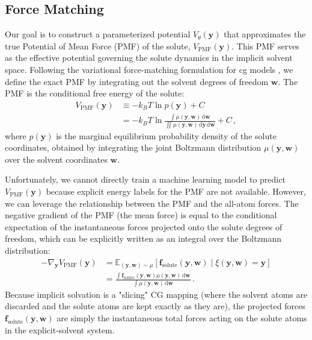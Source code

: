 \subsection{Force Matching}
\label{subsec:force_matching}

Our goal is to construct a parameterized potential $V_{\theta}(\mathbf{y})$ that approximates the true Potential of Mean Force (PMF) of the solute, $V_{\mathrm{PMF}}(\mathbf{y})$. This PMF serves as the effective potential governing the solute dynamics in the implicit solvent space. Following the variational force-matching formulation for \gls{cg} models \citep{noid_multiscale_2008, cgBasics}, we define the exact PMF by integrating out the solvent degrees of freedom $\mathbf{w}$. The PMF is the conditional free energy of the solute:
\begin{align}
    V_{\mathrm{PMF}}(\mathbf{y}) &\equiv -k_B T \ln p(\mathbf{y}) + C \nonumber \\
    &= -k_B T \ln \frac{\int \mu(\mathbf{y}, \mathbf{w}) \, \mathrm{d}\mathbf{w}}{\iint \mu(\mathbf{y}, \mathbf{w}) \, \mathrm{d}\mathbf{y} \, \mathrm{d}\mathbf{w}} + C \, ,
\end{align}
where $p(\mathbf{y})$ is the marginal equilibrium probability density of the solute coordinates, obtained by integrating the joint Boltzmann distribution $\mu(\mathbf{y}, \mathbf{w})$ over the solvent coordinates $\mathbf{w}$.

Unfortunately, we cannot directly train a machine learning model to predict $V_{\mathrm{PMF}}(\mathbf{y})$ because explicit energy labels for the PMF are not available. However, we can leverage the relationship between the PMF and the all-atom forces. The negative gradient of the PMF (the mean force) is equal to the conditional expectation of the instantaneous forces projected onto the solute degrees of freedom, which can be explicitly written as an integral over the Boltzmann distribution:
\begin{align}
    -\nabla_{\mathbf{y}} V_{\mathrm{PMF}}(\mathbf{y}) &= \mathbb{E}_{(\mathbf{y}, \mathbf{w}) \sim \mu} \left[ \mathbf{f}_{\mathrm{solute}}(\mathbf{y}, \mathbf{w}) \mid \xi(\mathbf{y}, \mathbf{w}) = \mathbf{y} \right] \nonumber \\
    &= \frac{\int \mathbf{f}_{\mathrm{solute}}(\mathbf{y}, \mathbf{w}) \mu(\mathbf{y}, \mathbf{w}) \, \mathrm{d}\mathbf{w}}{\int \mu(\mathbf{y}, \mathbf{w}) \, \mathrm{d}\mathbf{w}} \, .
\end{align}
Because implicit solvation is a "slicing" CG mapping (where the solvent atoms are discarded and the solute atoms are kept exactly as they are), the projected forces $\mathbf{f}_{\mathrm{solute}}(\mathbf{y}, \mathbf{w})$ are simply the instantaneous total forces acting on the solute atoms in the explicit-solvent system.

